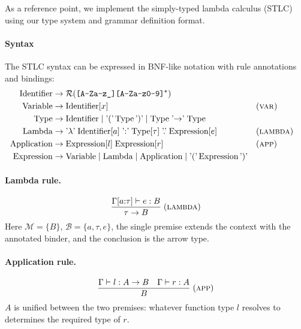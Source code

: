 As a reference point, we implement the simply-typed lambda calculus (STLC) using our type system and grammar definition format.

\paragraph{Syntax} The STLC syntax can be expressed in BNF-like notation with rule annotations and bindings:
$$
	\begin{aligned}
		\text{Identifier}  & \to \mathcal{R}(\texttt{[A-Za-z\_][A-Za-z0-9]$^\star$})                                                                                     \\
		\text{Variable}    & \to \text{Identifier}[x]                                                                                      &  & (\text{\textsc{var}})    \\
		\text{Type}        & \to \text{Identifier} \mid \text{'('}\,\text{Type}\,\text{')'} \mid \text{Type}\;\text{'$\to$'}\;\text{Type}                                \\
		\text{Lambda}      & \to \text{'$\lambda$'}\;\text{Identifier}[a]\;\text{':'}\;\text{Type}[\tau]\;\text{'.'}\;\text{Expression}[e] &  & (\text{\textsc{lambda}}) \\
		\text{Application} & \to \text{Expression}[l]\;\text{Expression}[r]                                                                &  & (\text{\textsc{app}})    \\
		\text{Expression}  & \to \text{Variable} \mid \text{Lambda} \mid \text{Application} \mid \text{'('}\,\text{Expression}\,\text{')'}
	\end{aligned}
$$

\paragraph{Lambda rule.}

\[
	\frac{\Gamma[a{:}\tau] \vdash e : B}{\tau \to B} \; (\text{\textsc{lambda}})
\]
Here $\mathcal{M} = \{B\}$, $\mathcal{B} = \{a, \tau, e\}$, the single premise extends the context with the annotated binder, and the conclusion is the arrow type.

\paragraph{Application rule.}
\[
	\frac{\Gamma \vdash l : A \to B \quad \Gamma \vdash r : A}{B} \; (\text{\textsc{app}})
\]
$A$ is unified between the two premises: whatever function type $l$ resolves to determines the required type of $r$.

